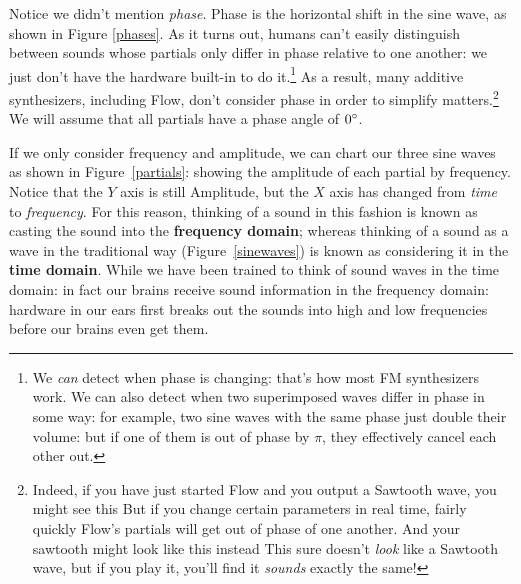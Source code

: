 \documentclass{article}
\newcommand\name{Flow}
\begin{document}
Notice we didn't mention {\it phase}.  Phase is the horizontal shift in the sine wave, as shown in Figure \ref{phases}.  As it turns out, humans can't easily distinguish between sounds whose partials only differ in phase relative to one another: we just don't have the hardware built-in to do it.\footnote{We {\it can} detect when phase is changing: that's how most FM synthesizers work.  We can also detect when two superimposed waves differ in phase in some way: for example, two sine waves with the same phase just double their volume: but if one of them is out of phase by \(\pi\), they effectively cancel each other out.}   As a result,  many additive synthesizers, including {\name}, don't consider phase in order to simplify matters.\footnote{Indeed, if you have just started Flow and you output a Sawtooth wave, you might see this \quad But if you change certain parameters in real time, fairly quickly Flow's partials will get out of phase of one another.  And your sawtooth might look like this instead
\quad This sure doesn't {\it look} like a Sawtooth wave, but if you play it, you'll find it {\it sounds} exactly the same!}  We will assume that all partials have a phase angle of \(0\degree\).

If we only consider frequency and amplitude, we can chart our three sine waves as shown in Figure~\ref{partials}: showing the amplitude of each partial by frequency.  Notice that the \(Y\) axis is still Amplitude, but the \(X\) axis has changed from {\it time} to {\it frequency}. For this reason, thinking of a sound in this fashion is known as casting the sound into the {\bf frequency domain}; whereas thinking of a sound as a wave in the traditional way (Figure~\ref{sinewaves}) is known as considering it in the {\bf time domain}.  While we have been trained to think of sound waves in the time domain: in fact our brains receive sound information in the frequency domain: hardware in our ears first breaks out the sounds into high and low frequencies before our brains even get them.
\end{document}
